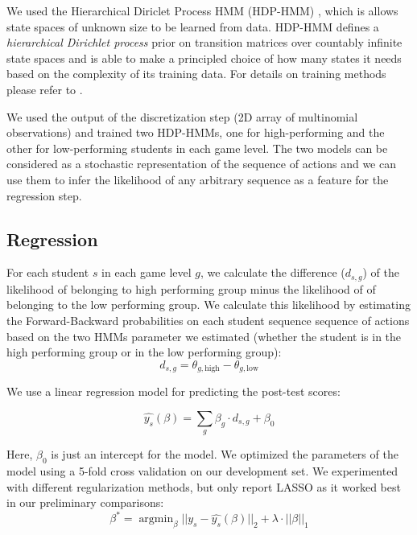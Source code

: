 \documentclass{sigchi}
\DeclareMathOperator*{\argmin}{argmin}
\begin{document}
We used the Hierarchical Diriclet Process HMM (HDP-HMM) \cite{fox2008hdp}, which is allows state spaces of unknown size to be learned from data. 
HDP-HMM defines a \textit{hierarchical Dirichlet process} prior on transition matrices over countably infinite state spaces and is able to make a principled choice of how many states it needs based on the complexity of its training data. 
For details on training methods please refer to \cite{fox2008hdp}.

We used the output of the discretization step (2D array of multinomial observations) and trained two HDP-HMMs, one for high-performing and the other for low-performing students in each game level. The two models can be considered as a stochastic representation of the sequence of actions and we can use them to infer the likelihood of any arbitrary sequence as a feature for the regression step. 

\subsection{Regression}

For each student $s$  in each game level $g$, we calculate the difference ($d_{s,g}$) of the likelihood of belonging to high performing group minus the likelihood of of belonging to the low performing group.
We calculate this likelihood by estimating the Forward-Backward probabilities  on each student sequence sequence of actions  based on the two HMMs parameter we estimated (whether the student is in the high performing group or in the low performing group):
\begin{equation}
d_{s,g} = \theta_{g, \text{high}} - \theta_{g, \text{low}}
\end{equation}

We use  a linear regression model for predicting the post-test scores:

\begin{equation}
\hat {y_s}(\beta) =   \sum_g \beta_g \cdot d_{s,g}  + \beta_0
\end{equation}

Here, $\beta_0$ is just an intercept for the  model.  
We optimized the parameters of the model using a 5-fold cross validation on our development set.
We experimented with different regularization methods, but only report LASSO \cite{tibshirani1996regression} as it worked best in our preliminary comparisons:
\begin{equation}
\beta^* = \argmin_\beta || y_s - \hat{y_s}(\beta)  ||_2 + \lambda \cdot || \beta ||_1
\end{equation}
\end{document}
